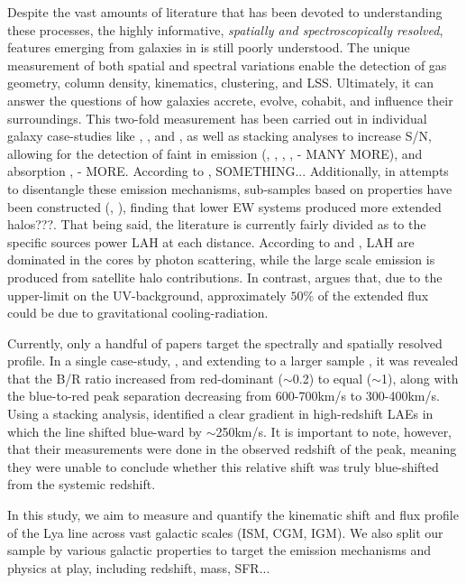 \documentclass[linenumbers,amsmath,trackchanges,preprint2]{aastex702}
\begin{document}
\par Despite the vast amounts of literature that has been devoted to understanding these processes, the highly informative, \textit{spatially and spectroscopically resolved}, features emerging from galaxies in \lya is still poorly understood. The unique measurement of both spatial and spectral variations enable the detection of gas geometry, column density, kinematics, clustering, and LSS. Ultimately, it can answer the questions of how galaxies accrete, evolve, cohabit, and influence their surroundings. This two-fold measurement has been carried out in individual galaxy case-studies like \cite{erb2018}, \cite{leclercq2017}, and \cite{wisotzki2016}, as well as stacking analyses to increase S/N, allowing for the detection of faint \lya in emission (\cite{steidel2011}, \cite{niemeyer2022hetdex}, \cite{erb2023}, \cite{guo2024muse}, \cite{trainor2025} - MANY MORE), and absorption {\cite{rudie2012}, \cite{chen2020} - MORE}. According to \cite{leclercq2017}, SOMETHING...
Additionally, in attempts to disentangle these emission mechanisms, sub-samples based on \lya properties have been constructed (\cite{steidel2011}, \cite{trainor2025}), finding that lower EW systems produced more extended halos???. That being said, the literature is currently fairly divided as to the specific sources power LAH at each distance. According to \cite{niemeyer2022hetdex} and \cite{byrohl2021}, LAH are dominated in the cores by photon scattering, while the large scale emission is produced from satellite halo contributions. In contrast, \cite{lake2015} argues that, due to the upper-limit on the UV-background, approximately $50\%$ of the extended flux could be due to gravitational cooling-radiation.
\par Currently, only a handful of papers target the spectrally and spatially resolved \lya profile. In a single case-study, \cite{erb2018}, and extending to a larger sample \cite{erb2023}, it was revealed that the B/R ratio increased from red-dominant ($\sim$0.2) to equal ($\sim$1), along with the blue-to-red peak separation decreasing from 600-700km/s to 300-400km/s. Using a stacking analysis, \cite{guo2024spec} identified a clear gradient in high-redshift LAEs in which the \lya line shifted blue-ward by $\sim$250km/s. It is important to note, however, that their measurements were done in the observed redshift of the \lya peak, meaning they were unable to conclude whether this relative shift was truly blue-shifted from the systemic redshift.
\par In this study, we aim to measure and quantify the kinematic shift and flux profile of the Lya line across vast galactic scales (ISM, CGM, IGM). We also split our sample by various galactic properties to target the emission mechanisms and physics at play, including redshift, mass, SFR...
\end{document}
